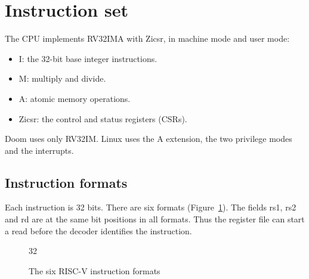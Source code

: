 \section{Instruction set}
\label{sec:isa}

The CPU implements RV32IMA with Zicsr, in machine mode and user mode:

\begin{itemize}
  \item I: the 32-bit base integer instructions.
  \item M: multiply and divide.
  \item A: atomic memory operations.
  \item Zicsr: the control and status registers (CSRs).
\end{itemize}

Doom uses only RV32IM. Linux uses the A extension, the two privilege modes and the interrupts.

\subsection{Instruction formats}

Each instruction is 32 bits. There are six formats (Figure~\ref{fig:formats}). The fields rs1, rs2 and rd are at the same bit positions in all formats. Thus the register file can start a read before the decoder identifies the instruction.

\begin{figure}[H]
  \centering
  \begin{bitfield}{32}
    \begin{scope}[yshift=0cm]
    \end{scope}
    \begin{scope}[yshift=-1.55cm]
    \end{scope}
    \begin{scope}[yshift=-3.1cm]
    \end{scope}
    \begin{scope}[yshift=-4.65cm]
    \end{scope}
    \begin{scope}[yshift=-6.2cm]
    \end{scope}
    \begin{scope}[yshift=-7.75cm]
    \end{scope}
  \end{bitfield}
  \caption{The six RISC-V instruction formats}
  \label{fig:formats}
\end{figure}

